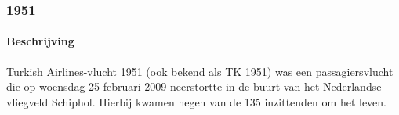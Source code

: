 \documentclass{article}
\begin{document}
	\subsubsection{1951}
	\paragraph{Beschrijving}
	Turkish Airlines-vlucht 1951 (ook bekend als TK 1951) was een passagiersvlucht die op woensdag 25 februari 2009 neerstortte in de buurt van het Nederlandse vliegveld Schiphol. Hierbij kwamen negen van de 135 inzittenden om het leven.
	
\end{document}
